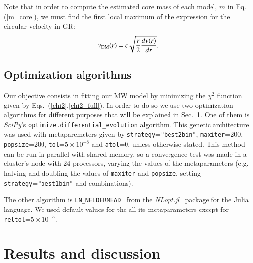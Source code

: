 \documentclass[twocolumn]{aa}
\begin{document}
Note that in order to compute the estimated core mass of each model, $m$ in Eq.(\ref{m_core}),
we must find the first local maximum of the expression for the circular velocity in GR:
\begin{equation}
   \label{v_circ_dm}
   v_{\rm{DM}}(r)= c\sqrt{\frac{r}{2}\frac{d\nu(r)}{dr}}.
\end{equation}

\subsection{Optimization algorithms}
\label{sec:optimization}

Our objective consists in fitting our MW model by minimizing the $\chi^2$ function given by Eqs.~(\ref{chi2},\ref{chi2_full}).  In order to do so we use two optimization algorithms for different purposes
that will be explained in Sec.~\ref{sec:results}.
One of them is {\it SciPy}'s
\texttt{optimize.differential\_evolution} algorithm. This genetic architecture
was used with metaparemeters given by
\texttt{strategy}=\texttt{"best2bin"}, \texttt{maxiter}=200, \texttt{popsize}=200,
\texttt{tol}=$5\times10^{-8}$ and \texttt{atol}=0, unless otherwise stated. This method can be run in parallel with shared memory,
so a convergence test was made in a cluster's node with 24 processors, varying the values of the metaparameters (e.g. halving and doubling the values of \texttt{maxiter} and \texttt{popsize}, setting \texttt{strategy}=\texttt{"best1bin"} and combinations).

The other algorithm is \texttt{LN\_NELDERMEAD}~\citep{NELDERMEAD,10.1093/comjnl/8.1.42,shere} from the
{\it NLopt.jl}~\citep{NLopt} package
for the {\sc Julia}~\citep{bezanson2017julia} language.
We used default values for the all its metaparameters except for
\texttt{reltol}=$5\times10^{-5}$.



\section{Results and discussion}
\label{sec:results}
\end{document}
